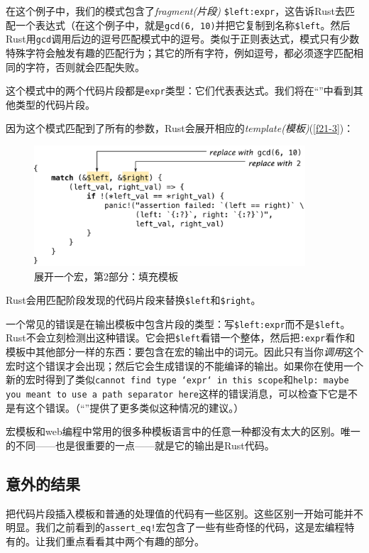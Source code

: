 在这个例子中，我们的模式包含了\emph{fragment(片段)} \texttt{\$left:expr}，这告诉Rust去匹配一个表达式（在这个例子中，就是\texttt{gcd(6, 10)}并把它复制到名称\texttt{\$left}。然后Rust用\texttt{gcd}调用后边的逗号匹配模式中的逗号。类似于正则表达式，模式只有少数特殊字符会触发有趣的匹配行为；其它的所有字符，例如逗号，都必须逐字匹配相同的字符，否则就会匹配失败。

这个模式中的两个代码片段都是\texttt{expr}类型：它们代表表达式。我们将在“”中看到其他类型的代码片段。

因为这个模式匹配到了所有的参数，Rust会展开相应的\emph{template(模板)}(\autoref{f21-3})：
\begin{figure}[htbp]
    \centering
    \includegraphics[width=0.9\textwidth]{../img/f21-3.png}
    \caption{展开一个宏，第2部分：填充模板}
    \label{f21-3}
\end{figure}

Rust会用匹配阶段发现的代码片段来替换\texttt{\$left}和\texttt{\$right}。

一个常见的错误是在输出模板中包含片段的类型：写\texttt{\$left:expr}而不是\texttt{\$left}。Rust不会立刻检测出这种错误。它会把\texttt{\$left}看错一个整体，然后把\texttt{:expr}看作和模板中其他部分一样的东西：要包含在宏的输出中的词元。因此只有当你\emph{调用}这个宏时这个错误才会出现；然后它会生成错误的不能编译的输出。如果你在使用一个新的宏时得到了类似\texttt{cannot find type `expr` in this scope}和\texttt{help: maybe you meant to use a path separator here}这样的错误消息，可以检查下它是不是有这个错误。（“”提供了更多类似这种情况的建议。）

宏模板和web编程中常用的很多种模板语言中的任意一种都没有太大的区别。唯一的不同——也是很重要的一点——就是它的输出是Rust代码。

\subsection{意外的结果}
把代码片段插入模板和普通的处理值的代码有一些区别。这些区别一开始可能并不明显。我们之前看到的\texttt{assert\_eq!}宏包含了一些有些奇怪的代码，这是宏编程特有的。让我们重点看看其中两个有趣的部分。

